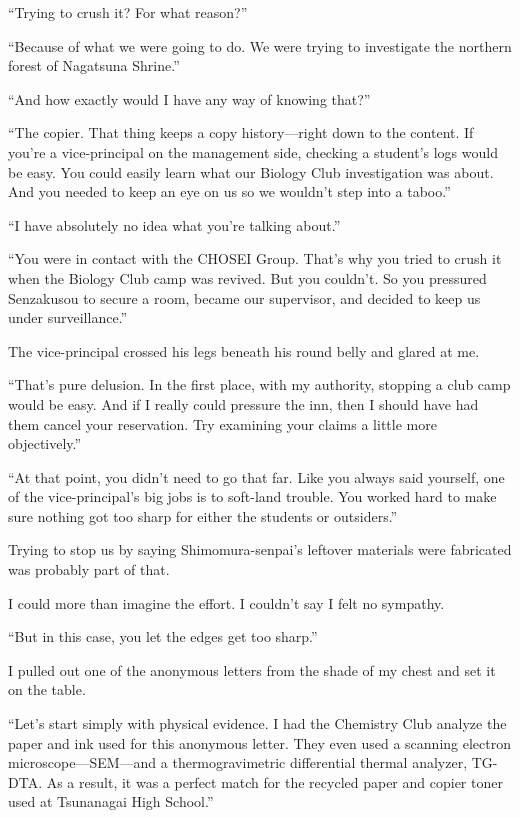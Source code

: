 \documentclass[
    a4paper,
    12pt,
    twoside,
    openany,
    UTF8,
    fontset=windows
]{ctexbook}
\begin{document}
``Trying to crush it? For what reason?''

``Because of what we were going to do. We were trying to investigate the northern forest of Nagatsuna Shrine.''

``And how exactly would I have any way of knowing that?''

``The copier. That thing keeps a copy history---right down to the content. If you're a vice-principal on the management side, checking a student's logs would be easy. You could easily learn what our Biology Club investigation was about. And you needed to keep an eye on us so we wouldn't step into a taboo.''

``I have absolutely no idea what you're talking about.''

``You were in contact with the CHOSEI Group. That's why you tried to crush it when the Biology Club camp was revived. But you couldn't. So you pressured Senzakusou to secure a room, became our supervisor, and decided to keep us under surveillance.''

The vice-principal crossed his legs beneath his round belly and glared at me.

``That's pure delusion. In the first place, with my authority, stopping a club camp would be easy. And if I really could pressure the inn, then I should have had them cancel your reservation. Try examining your claims a little more objectively.''

``At that point, you didn't need to go that far. Like you always said yourself, one of the vice-principal's big jobs is to soft-land trouble. You worked hard to make sure nothing got too sharp for either the students or outsiders.''

Trying to stop us by saying Shimomura-senpai's leftover materials were fabricated was probably part of that.

I could more than imagine the effort. I couldn't say I felt no sympathy.

``But in this case, you let the edges get too sharp.''

I pulled out one of the anonymous letters from the shade of my chest and set it on the table.

``Let's start simply with physical evidence. I had the Chemistry Club analyze the paper and ink used for this anonymous letter. They even used a scanning electron microscope---SEM---and a thermogravimetric differential thermal analyzer, TG-DTA. As a result, it was a perfect match for the recycled paper and copier toner used at Tsunanagai High School.''
\end{document}
